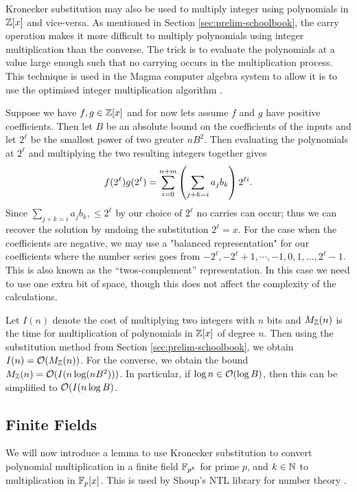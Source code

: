 Kronecker substitution may also be used to multiply integer using polynomials in ${\mathbb Z}[x]$ and vice-versa. As mentioned in Section \ref{sec:prelim-schoolbook}, the carry operation makes it more difficult to multiply polynomials using integer multiplication than the converse. The trick is to evaluate the polynomials at a value large enough such that no carrying occurs in the multiplication process. This technique is used in the Magma computer algebra system to allow it is to use the optimised integer multiplication algorithm \cite{magma}.

Suppose we have $f,g \in {\mathbb Z}[x]$ and for now lets assume $f$ and $g$ have positive coefficients. Then let $B$ be an absolute bound on the coefficients of the inputs and let $2^\ell$ be the smallest power of two greater $nB^2$. Then evaluating the polynomials at $2^\ell$ and multiplying the two resulting integers together gives
\[
    f(2^\ell)g(2^\ell) = \sum^{n+m}_{i=0} \left(\sum_{j + k = i} a_jb_k\right)2^{\ell i}.
\]
Since $\sum_{j + k = i}a_j b_k,\leq 2^{\ell}$ by our choice of $2^\ell$ no carries can occur; thus we can recover the solution by undoing the substitution $2^\ell = x$. For the case when the coefficients are negative, we may use a "balanced representation" for our coefficients where the number series goes from $-2^\ell, -2^\ell + 1, \cdots, -1, 0, 1, \ldots, 2^\ell - 1$. This is also known as the ``twos-complement'' representation. In this case we need to use one extra bit of space, though this does not affect the complexity of the calculations.

Let $I(n)$ denote the cost of multiplying two integers with $n$ bits and $M_{\mathbb Z}(n)$ is the time for multiplication of polynomials in ${\mathbb Z}[x]$ of degree $n$. Then using the substitution method from Section \ref{sec:prelim-schoolbook}, we obtain $I(n) = \mathcal O(M_{\mathbb Z}(n))$. For the converse, we obtain the bound $M_{\mathbb Z}(n) = \mathcal O(I(n\log (nB^2)))$. In particular, if $\log n \in \mathcal O(\log B)$, then this can be simplified to $\mathcal O(I(n \log B)$.

\subsection{Finite Fields}%
\label{sub:finite-field}

We will now introduce a lemma to use Kronecker substitution to convert polynomial multiplication in a finite field ${\mathbb F}_{p^k}$ for prime $p$, and $k\in {\mathbb N}$ to multiplication in ${\mathbb F}_p [x]$. This is used by Shoup's NTL library for number theory \cite{ntl}.

